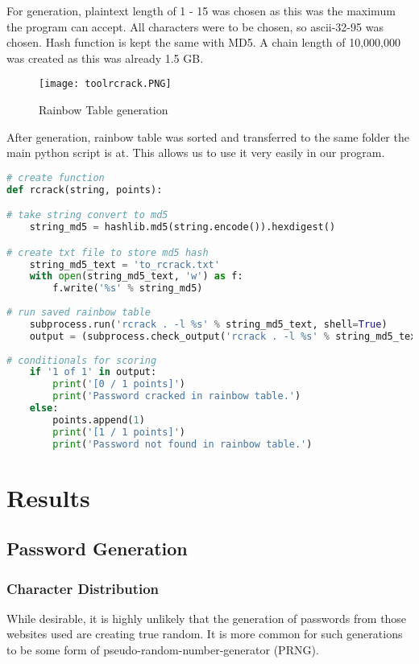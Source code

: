 \documentclass[letterpaper,twocolumn,10pt]{article}
\begin{document}
For generation, plaintext length of 1 - 15 was chosen as this was the maximum the program can accept. All characters were to be chosen, so ascii-32-95 was chosen. Hash function is kept the same with MD5. A chain length of 10,000,000 was created as this was already 1.5 GB.

\begin{figure}[H]
    \centering
    \texttt{[image: toolrcrack.PNG]}
    \caption{Rainbow Table generation}
\end{figure}

After generation, rainbow table was sorted and transferred to the same folder the main python script is at. This allows us to use it very easily in our program. 

\begin{lstlisting}[language=python, frame=none]
# create function
def rcrack(string, points):

# take string convert to md5
    string_md5 = hashlib.md5(string.encode()).hexdigest()

# create txt file to store md5 hash 
    string_md5_text = 'to_rcrack.txt'
    with open(string_md5_text, 'w') as f:
        f.write('%s' % string_md5)
        
# run saved rainbow table
    subprocess.run('rcrack . -l %s' % string_md5_text, shell=True)
    output = (subprocess.check_output('rcrack . -l %s' % string_md5_text, shell=True)).decode('utf-8')
    
# conditionals for scoring
    if '1 of 1' in output:
        print('[0 / 1 points]')
        print('Password cracked in rainbow table.')
    else:
        points.append(1)
        print('[1 / 1 points]')
        print('Password not found in rainbow table.')
\end{lstlisting}

\section{Results}

\subsection{Password Generation}

\subsubsection{Character Distribution}
While desirable, it is highly unlikely that the generation of passwords from those websites used are creating true random. It is more common for such generations to be some form of pseudo-random-number-generator (PRNG). 
\end{document}
